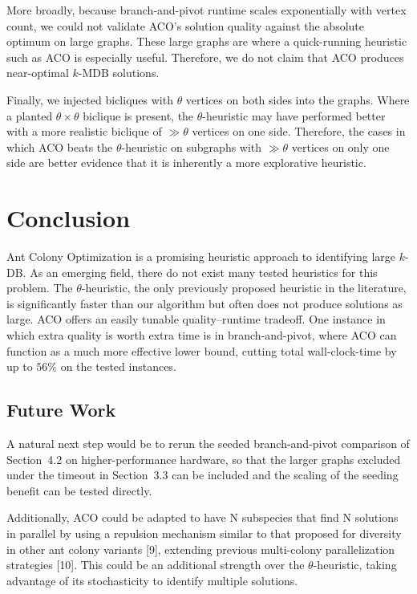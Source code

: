 \documentclass[conference]{IEEEtran}
\begin{document}
More broadly, because branch-and-pivot runtime scales exponentially with vertex count, we could not validate ACO's solution quality against the absolute optimum on large graphs. These large graphs are where a quick-running heuristic such as ACO is especially useful. Therefore, we do not claim that ACO produces near-optimal $k$-MDB solutions.


Finally, we injected bicliques with $\theta$ vertices on both sides into the graphs. Where a planted $\theta \times \theta$ biclique is present, the $\theta$-heuristic may have performed better with a more realistic biclique of $\gg \theta$ vertices on one side. Therefore, the cases in which ACO beats the $\theta$-heuristic on subgraphs with $\gg \theta$ vertices on only one side are better evidence that it is inherently a more explorative heuristic.


\section{Conclusion}


Ant Colony Optimization is a promising heuristic approach to identifying large $k$-DB. As an emerging field, there do not exist many tested heuristics for this problem. The $\theta$-heuristic, the only previously proposed heuristic in the literature, is significantly faster than our algorithm but often does not produce solutions as large. ACO offers an easily tunable quality--runtime tradeoff. One instance in which extra quality is worth extra time is in branch-and-pivot, where ACO can function as a much more effective lower bound, cutting total wall-clock-time by up to $56\%$ on the tested instances.


\subsection{Future Work}


A natural next step would be to rerun the seeded branch-and-pivot comparison of Section~4.2 on higher-performance hardware, so that the larger graphs excluded under the timeout in Section~3.3 can be included and the scaling of the seeding benefit can be tested directly.


Additionally, ACO could be adapted to have N subspecies that find N solutions in parallel by using a repulsion mechanism similar to that proposed for diversity in other ant colony variants [9], extending previous multi-colony parallelization strategies [10]. This could be an additional strength over the $\theta$-heuristic, taking advantage of its stochasticity to identify multiple solutions.
\end{document}
